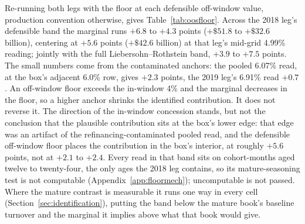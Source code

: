 Re-running both legs with the floor at each defensible off-window value, production convention otherwise, gives Table~\ref{tab:oosfloor}. Across the 2018 leg's defensible band the marginal runs $+6.8$ to $+4.3$ points ($+\$51.8$ to $+\$32.6$ billion), centering at $+5.6$ points ($+\$42.6$ billion) at that leg's mid-grid 4.99\% reading; jointly with the full Liebersohn--Rothstein band, $+3.9$ to $+7.5$ points. The small numbers come from the contaminated anchors: the pooled 6.07\% read, at the box's adjacent 6.0\% row, gives $+2.3$ points, the 2019 leg's 6.91\% read $+0.7$. An off-window floor exceeds the in-window 4\% and the marginal decreases in the floor, so a higher anchor shrinks the identified contribution. It does not reverse it. The direction of the in-window concession stands, but not the conclusion that the plausible contribution sits at the box's lower edge: that edge was an artifact of the refinancing-contaminated pooled read, and the defensible off-window floor places the contribution in the box's interior, at roughly $+5.6$ points, not at $+2.1$ to $+2.4$. Every read in that band sits on cohort-months aged twelve to twenty-four, the only ages the 2018 leg contains, so its mature-seasoning test is not computable (Appendix~\ref{app:floormech}); uncomputable is not passed. Where the mature contrast is measurable it runs one way in every cell (Section~\ref{sec:identification}), putting the band below the mature book's baseline turnover and the marginal it implies above what that book would give.

